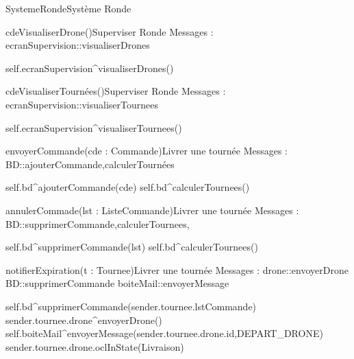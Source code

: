 \begin{OM}{SystemeRonde}{Système Ronde}

\begin{OMOperation}{cdeVisualiserDrone()}{Superviser Ronde}{}
Messages :
    ecranSupervision::{visualiserDrones}
    \begin{OMPre}
    \end{OMPre}
    \begin{OMPost}
self.ecranSupervision^visualiserDrones()
\end{OMPost}
\end{OMOperation}

\begin{OMOperation}{cdeVisualiserTournées()}{Superviser Ronde}{}
Messages :
ecranSupervision::{visualiserTournees}
\begin{OMPre}
\end{OMPre}
\begin{OMPost}
self.ecranSupervision^visualiserTournees()
\end{OMPost}
\end{OMOperation}

\begin{OMOperation}{envoyerCommande(cde : Commande)}{Livrer une tournée}{}
Messages :
BD::{ajouterCommande,calculerTournées}
\begin{OMPre}
\end{OMPre}
\begin{OMPost}
        self.bd^ajouterCommande(cde)
self.bd^calculerTournees()
\end{OMPost}
\end{OMOperation}

\begin{OMOperation}{annulerCommade(lst : ListeCommande)}{Livrer une tournée}{}
Messages :
BD::{supprimerCommande,calculerTournees,}
\begin{OMPre}
\end{OMPre}
\begin{OMPost}
self.bd^supprimerCommande(lst)
self.bd^calculerTournees()
\end{OMPost}
\end{OMOperation}

\begin{OMOperation}{notifierExpiration(t : Tournee)}{Livrer une tournée}{}
Messages :
drone::{envoyerDrone}
BD::{supprimerCommande}
boiteMail::{envoyerMessage}
\begin{OMPre}
\end{OMPre}
\begin{OMPost}
self.bd^supprimerCommande(sender.tournee.lstCommande)
sender.tournee.drone^envoyerDrone()
self.boiteMail^envoyerMessage(sender.tournee.drone.id,DEPART_DRONE)
sender.tournee.drone.oclInState(Livraison)
\end{OMPost}
\end{OMOperation}


\end{OM}
